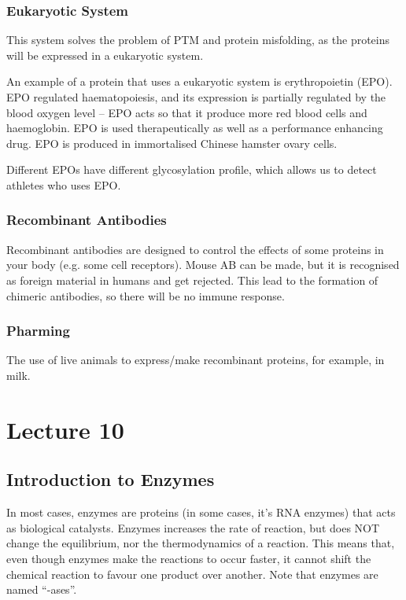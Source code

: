 \documentclass[a4paper, 12pt]{report}
\newcommand{\mychapter}[2]{
    \setcounter{chapter}{#1}
    \setcounter{section}{0}
    \chapter*{#2}
    \addcontentsline{toc}{chapter}{#2}
}
\begin{document}
\subsection{Eukaryotic System}

This system solves the problem of PTM and protein misfolding, as the proteins will be expressed in a eukaryotic system.

An example of a protein that uses a eukaryotic system is erythropoietin (EPO).
EPO regulated haematopoiesis, and its expression is partially regulated by the blood oxygen level -- EPO acts so that it produce more red blood cells and haemoglobin.
EPO is used therapeutically as well as a performance enhancing drug.
EPO is produced in immortalised Chinese hamster ovary cells.

Different EPOs have different glycosylation profile, which allows us to detect athletes who uses EPO.

\subsection{Recombinant Antibodies}

Recombinant antibodies are designed to control the effects of some proteins in your body (e.g. some cell receptors).
Mouse AB can be made, but it is recognised as foreign material in humans and get rejected.
This lead to the formation of chimeric antibodies, so there will be no immune response.

\subsection{Pharming}

The use of live animals to express/make recombinant proteins, for example, in milk.

\mychapter{10}{Lecture 10}

\section{Introduction to Enzymes}

In most cases, enzymes are proteins (in some cases, it's RNA enzymes) that acts as biological catalysts.
Enzymes increases the rate of reaction, but does NOT change the equilibrium, nor the thermodynamics of a reaction.
This means that, even though enzymes make the reactions to occur faster, it cannot shift the chemical reaction to favour one product over another.
Note that enzymes are named ``-ases''.
\end{document}
